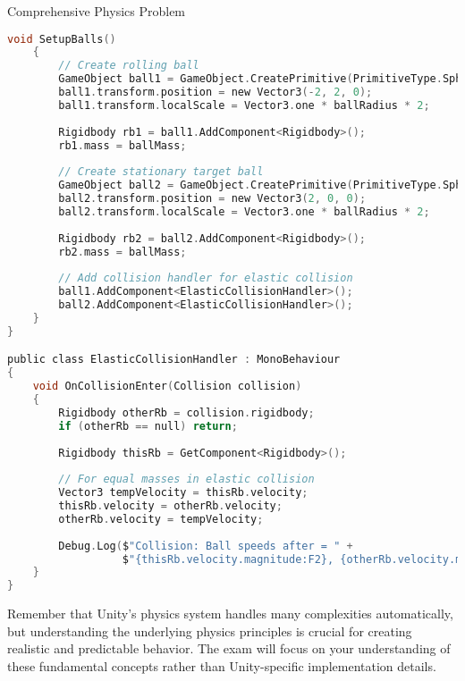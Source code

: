 \begin{example2}{Comprehensive Physics Problem}
\begin{lstlisting}[language=C, style=basesmol]
    void SetupBalls() 
    {
        // Create rolling ball
        GameObject ball1 = GameObject.CreatePrimitive(PrimitiveType.Sphere);
        ball1.transform.position = new Vector3(-2, 2, 0);
        ball1.transform.localScale = Vector3.one * ballRadius * 2;
        
        Rigidbody rb1 = ball1.AddComponent<Rigidbody>();
        rb1.mass = ballMass;
        
        // Create stationary target ball
        GameObject ball2 = GameObject.CreatePrimitive(PrimitiveType.Sphere);
        ball2.transform.position = new Vector3(2, 0, 0);
        ball2.transform.localScale = Vector3.one * ballRadius * 2;
        
        Rigidbody rb2 = ball2.AddComponent<Rigidbody>();
        rb2.mass = ballMass;
        
        // Add collision handler for elastic collision
        ball1.AddComponent<ElasticCollisionHandler>();
        ball2.AddComponent<ElasticCollisionHandler>();
    }
}

public class ElasticCollisionHandler : MonoBehaviour 
{
    void OnCollisionEnter(Collision collision) 
    {
        Rigidbody otherRb = collision.rigidbody;
        if (otherRb == null) return;
        
        Rigidbody thisRb = GetComponent<Rigidbody>();
        
        // For equal masses in elastic collision
        Vector3 tempVelocity = thisRb.velocity;
        thisRb.velocity = otherRb.velocity;
        otherRb.velocity = tempVelocity;
        
        Debug.Log($"Collision: Ball speeds after = " +
                  $"{thisRb.velocity.magnitude:F2}, {otherRb.velocity.magnitude:F2}");
    }
}
\end{lstlisting}
\end{example2}

\begin{remark}
    Remember that Unity's physics system handles many complexities automatically, but understanding the underlying physics principles is crucial for creating realistic and predictable behavior. The exam will focus on your understanding of these fundamental concepts rather than Unity-specific implementation details.
\end{remark}